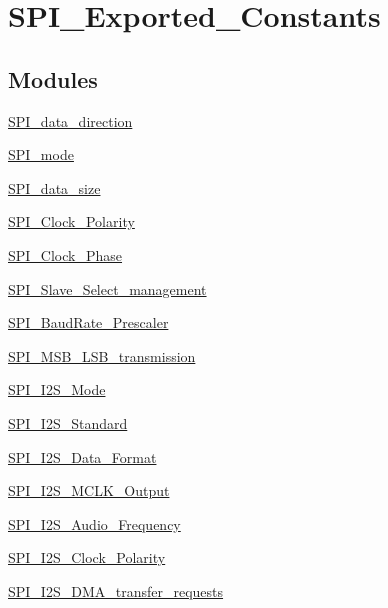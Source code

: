 \hypertarget{group___s_p_i___exported___constants}{}\section{S\+P\+I\+\_\+\+Exported\+\_\+\+Constants}
\label{group___s_p_i___exported___constants}
\subsection*{Modules}
\begin{DoxyCompactItemize}
\item 
\hyperlink{group___s_p_i__data__direction}{S\+P\+I\+\_\+data\+\_\+direction}
\item 
\hyperlink{group___s_p_i__mode}{S\+P\+I\+\_\+mode}
\item 
\hyperlink{group___s_p_i__data__size}{S\+P\+I\+\_\+data\+\_\+size}
\item 
\hyperlink{group___s_p_i___clock___polarity}{S\+P\+I\+\_\+\+Clock\+\_\+\+Polarity}
\item 
\hyperlink{group___s_p_i___clock___phase}{S\+P\+I\+\_\+\+Clock\+\_\+\+Phase}
\item 
\hyperlink{group___s_p_i___slave___select__management}{S\+P\+I\+\_\+\+Slave\+\_\+\+Select\+\_\+management}
\item 
\hyperlink{group___s_p_i___baud_rate___prescaler}{S\+P\+I\+\_\+\+Baud\+Rate\+\_\+\+Prescaler}
\item 
\hyperlink{group___s_p_i___m_s_b___l_s_b__transmission}{S\+P\+I\+\_\+\+M\+S\+B\+\_\+\+L\+S\+B\+\_\+transmission}
\item 
\hyperlink{group___s_p_i___i2_s___mode}{S\+P\+I\+\_\+\+I2\+S\+\_\+\+Mode}
\item 
\hyperlink{group___s_p_i___i2_s___standard}{S\+P\+I\+\_\+\+I2\+S\+\_\+\+Standard}
\item 
\hyperlink{group___s_p_i___i2_s___data___format}{S\+P\+I\+\_\+\+I2\+S\+\_\+\+Data\+\_\+\+Format}
\item 
\hyperlink{group___s_p_i___i2_s___m_c_l_k___output}{S\+P\+I\+\_\+\+I2\+S\+\_\+\+M\+C\+L\+K\+\_\+\+Output}
\item 
\hyperlink{group___s_p_i___i2_s___audio___frequency}{S\+P\+I\+\_\+\+I2\+S\+\_\+\+Audio\+\_\+\+Frequency}
\item 
\hyperlink{group___s_p_i___i2_s___clock___polarity}{S\+P\+I\+\_\+\+I2\+S\+\_\+\+Clock\+\_\+\+Polarity}
\item 
\hyperlink{group___s_p_i___i2_s___d_m_a__transfer__requests}{S\+P\+I\+\_\+\+I2\+S\+\_\+\+D\+M\+A\+\_\+transfer\+\_\+requests}

\end{DoxyCompactItemize}
